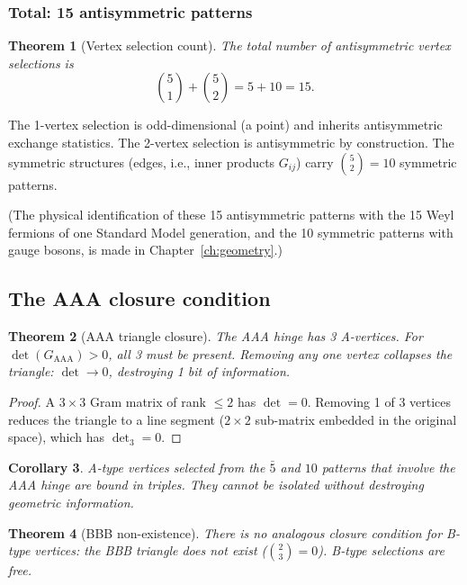 \documentclass[12pt]{article}
\newtheorem{theorem}{Theorem}[section]
\newtheorem{corollary}[theorem]{Corollary}
\theoremstyle{remark}
\theoremstyle{definition}
\begin{document}
\subsubsection{Total: 15 antisymmetric patterns}

\begin{theorem}[Vertex selection count]
\label{thm:15}
The total number of antisymmetric vertex selections is
\begin{equation}
\binom{5}{1} + \binom{5}{2} = 5 + 10 = 15.
\end{equation}
\end{theorem}

The 1-vertex selection is odd-dimensional (a point) and inherits antisymmetric exchange statistics. The 2-vertex selection is antisymmetric by construction. The symmetric structures (edges, i.e., inner products $G_{ij}$) carry $\binom{5}{2} = 10$ symmetric patterns.

(The physical identification of these 15 antisymmetric patterns with the 15 Weyl fermions of one Standard Model generation, and the 10 symmetric patterns with gauge bosons, is made in Chapter~\ref{ch:geometry}.)

\subsection{The AAA closure condition}
\label{sec:confinement_geometry}

\begin{theorem}[AAA triangle closure]
\label{thm:aaa_closure}
The AAA hinge has 3 A-vertices. For $\det(G_{\text{AAA}}) > 0$, all 3 must be present. Removing any one vertex collapses the triangle: $\det \to 0$, destroying 1 bit of information.
\end{theorem}

\begin{proof}
A $3 \times 3$ Gram matrix of rank $\leq 2$ has $\det = 0$. Removing 1 of 3 vertices reduces the triangle to a line segment ($2 \times 2$ sub-matrix embedded in the original space), which has $\det_3 = 0$.
\end{proof}

\begin{corollary}
A-type vertices selected from the $\bar{5}$ and $10$ patterns that involve the AAA hinge are bound in triples. They cannot be isolated without destroying geometric information.
\end{corollary}

\begin{theorem}[BBB non-existence]
There is no analogous closure condition for B-type vertices: the BBB triangle does not exist ($\binom{2}{3} = 0$). B-type selections are free.
\end{theorem}
\end{document}
